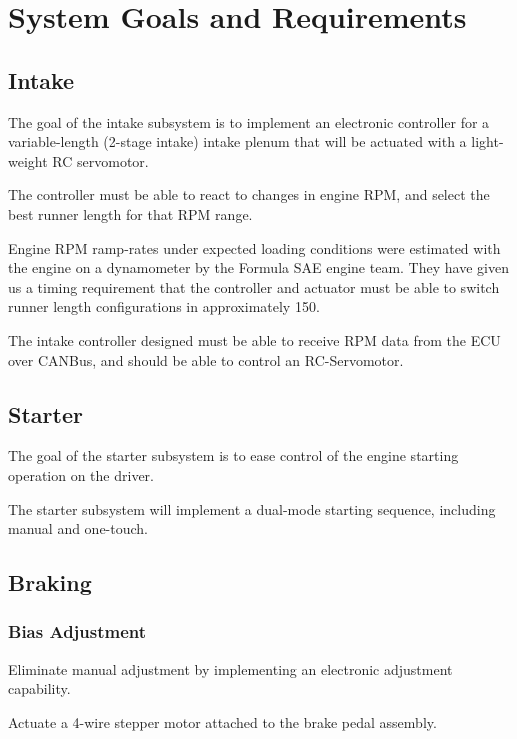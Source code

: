 \chapter{System Goals and Requirements\label{cha:goals_and_requirements}}



\section{Intake}

The goal of the intake subsystem is to implement an electronic controller for a variable-length (2-stage intake) intake plenum that will be actuated with a light-weight RC servomotor.

The controller must be able to react to changes in engine RPM, and select the best runner length for that RPM range.

Engine RPM ramp-rates under expected loading conditions were estimated with the engine on a dynamometer by the Formula SAE engine team. They have given us a timing requirement that the controller and actuator must be able to switch runner length configurations in approximately \unit{150}{\milli\second}.

The intake controller designed must be able to receive RPM data from the ECU over CANBus, and should be able to control an RC-Servomotor.

\section{Starter}

The goal of the starter subsystem is to ease control of the engine starting operation on the driver.

The starter subsystem will implement a dual-mode starting sequence, including manual and one-touch.

\section{Braking}


\subsection{Bias Adjustment}

Eliminate manual adjustment by implementing an electronic adjustment
capability. 

Actuate a 4-wire stepper motor attached to the brake pedal assembly.

